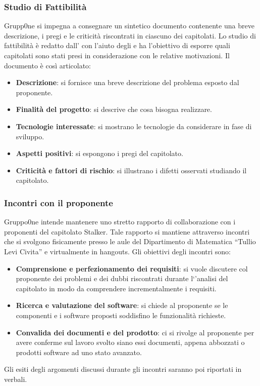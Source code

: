 \documentclass[../norme-di-progetto.tex]{subfiles}
\begin{document}
\subsubsection{Studio di Fattibilità}
\label{par:studio di fattibilità}
Grupp0ne si impegna a consegnare un sintetico documento contenente una breve descrizione, i pregi e le criticità riscontrati in ciascuno dei capitolati. Lo studio di fattibilità è redatto dall'
con l'aiuto degli  e ha l'obiettivo di esporre quali capitolati sono stati presi in considerazione con le relative motivazioni. Il documento è così articolato:
\begin{itemize}
\item \textbf{Descrizione}: si fornisce una breve descrizione del problema esposto dal proponente.
\item \textbf{Finalità del progetto}: si descrive che cosa bisogna realizzare.
\item \textbf{Tecnologie interessate}: si mostrano le tecnologie da considerare in fase di sviluppo.
\item \textbf{Aspetti positivi}: si espongono i pregi del capitolato.
\item \textbf{Criticità e fattori di rischio}: si illustrano i difetti osservati studiando il capitolato.
\end{itemize}
\subsubsection{Incontri con il proponente}
\label{subs:incontri con il proponente}
Gruppo0ne intende mantenere uno stretto rapporto di collaborazione con i proponenti del capitolato Stalker. Tale rapporto si mantiene attraverso incontri che si svolgono fisicamente presso le aule del Dipartimento di Matematica ``Tullio Levi Civita'' e virtualmente in hangouts.
Gli obiettivi degli incontri sono:
\begin{itemize}
\item \textbf{Comprensione e perfezionamento dei requisiti}: si vuole discutere col proponente dei problemi e dei dubbi riscontrati durante l`'analisi del capitolato in modo da comprendere incrementalmente i requisiti.
\item \textbf{Ricerca e valutazione del software}: si chiede al proponente se le componenti e i software proposti soddisfino le funzionalità richieste.
\item \textbf{Convalida dei documenti e del prodotto}: ci si rivolge al proponente per avere conferme sul lavoro svolto siano essi documenti,  appena abbozzati o prodotti software ad uno stato avanzato.
\end{itemize}
Gli esiti degli argomenti discussi durante gli incontri saranno poi riportati in verbali.
\end{document}
